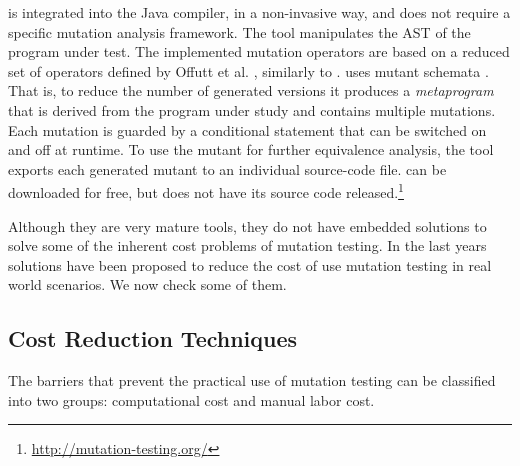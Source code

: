 \major{} \cite{JUST:2011:1} is integrated into the Java compiler, in a non-invasive way, and does not require a specific mutation analysis framework. 
The tool manipulates the AST of the program under test. 
The implemented mutation operators are based on a reduced set of operators defined by Offutt et al. \cite{OFFUT:1996:1}, similarly to \mujava{}.
\major{} uses mutant schemata \cite{UNTCH:1993:1}. 
That is, to reduce the number of generated versions it produces a \textit{metaprogram} that is derived from the program under study and contains multiple mutations.
Each mutation is guarded by a conditional statement that can be switched on and off at runtime.
To use the mutant for further equivalence analysis, the tool exports each generated mutant to an individual source-code file.
\major{} can be downloaded for free, but does not have its source code released.\footnote{\url{http://mutation-testing.org/}}

Although they are very mature tools, they do not have embedded solutions to solve some of the inherent cost problems of mutation testing.
In the last years solutions have been proposed to reduce the cost of use mutation testing in real world scenarios. 
We now check some of them.

\subsection{Cost Reduction Techniques}
The barriers that prevent the practical use of mutation testing can be classified into two groups: computational cost and manual labor cost.

